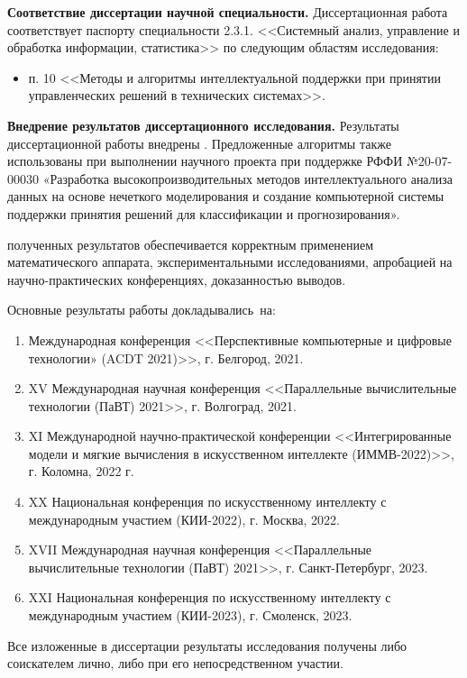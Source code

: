 \textbf{Соответствие диссертации научной специальности.} Диссертационная работа соответствует паспорту специальности 2.3.1. <<Системный анализ, управление и обработка информации, статистика>> по следующим областям исследования:
\begin{itemize}
  \item п. 10 <<Методы и алгоритмы интеллектуальной поддержки при принятии управленческих решений в технических системах>>.
\end{itemize}

\textbf{Внедрение результатов диссертационного исследования.} Результаты диссертационной работы внедрены \todo{\dots}. Предложенные алгоритмы также использованы при выполнении научного проек­та при поддержке РФФИ №20-07-00030 «Разработка высокопроизводительных методов интеллектуального анализа данных на основе нечеткого моделиро­вания и создание компьютерной системы поддержки принятия решений для классификации и прогнозирования».

{\reliability} полученных результатов обеспечивается корректным применением математического аппарата, экспериментальными исследованиями, апробацией на научно-практических конференциях, доказанностью выводов.

{\probation}
Основные результаты работы докладывались~на:
\begin{enumerate}
	\item Международная конференция <<Перспективные компьютерные и цифровые технологии» (ACDT 2021)>>,
	г. Белгород, 2021.
	\item XV Международная научная конференция <<Параллельные вычислительные технологии (ПаВТ) 2021>>, г. Волгоград, 2021.
	\item XI Международной научно-практической конференции <<Интегрированные модели и мягкие вычисления в искусственном интеллекте (ИММВ-2022)>>, г. Коломна, 2022 г.
	\item XX Национальная конференция по искусственному интеллекту с международным участием (КИИ-2022), г. Москва, 2022.
	\item XVII Международная научная конференция <<Параллельные вычислительные технологии (ПаВТ) 2021>>, г. Санкт-Петербург, 2023.
	\item XXI Национальная конференция по искусственному интеллекту с международным участием (КИИ-2023), г. Смоленск, 2023.
\end{enumerate}

{\contribution} Все изложенные в диссертации результаты исследования получены либо соискателем лично, либо при его непосредственном участии.

